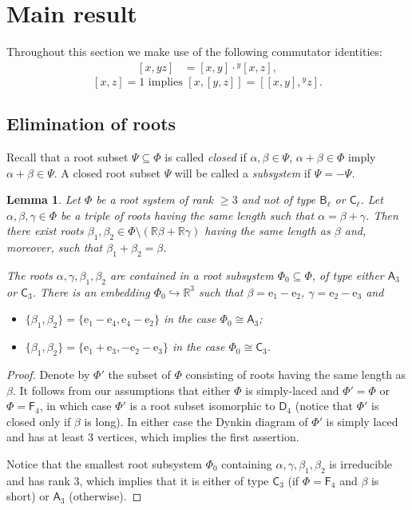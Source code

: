 \documentclass{article}
\numberwithin{equation}{section}
\newtheorem{lemma}{Lemma} \numberwithin{lemma}{section}
\theoremstyle{definition}
\theoremstyle{remark}
\newcommand{\rA}{\mathsf{A}}
\newcommand{\rB}{\mathsf{B}}
\newcommand{\rC}{\mathsf{C}}
\newcommand{\rD}{\mathsf{D}}
\newcommand{\rF}{\mathsf{F}}
\begin{document}
\section{Main result}
Throughout this section we make use of the following commutator identities:
\begin{align}
\label{eq:comm-mult-rhs}[x, yz]& =   [x, y] \cdot {}^{y}\![x, z],
\end{align}
\begin{equation} \label{eq:HW-corr} [x,z] = 1 \text{ implies } [x, [y,z]] = [[x,y],{}^yz]. \end{equation} 
\subsection{Elimination of roots}
Recall that a root subset $\Psi \subseteq \Phi$ is called {\it closed} if $\alpha, \beta \in \Psi$, $\alpha+\beta\in\Phi$ imply $\alpha+\beta\in \Psi$. A closed root subset $\Psi$ will be called a {\it subsystem} if $\Psi = -\Psi$.

\begin{lemma}\label{ThreeRoots}
Let \(\Phi\) be a root system of rank \(\geq 3\) and not of type \(\rB_\ell\) or \(\rC_\ell\). Let \(\alpha, \beta, \gamma \in \Phi\) be a triple of roots having the same length such that $\alpha = \beta + \gamma$.  
Then there exist roots \(\beta_1, \beta_2 \in \Phi \setminus (\mathbb R\beta + \mathbb R\gamma)\) having the same length as $\beta$ and, moreover, such that \(\beta_1 + \beta_2 = \beta\).

The roots $\alpha, \gamma, \beta_1, \beta_2$ are contained in a root subsystem $\Phi_0 \subseteq \Phi$, of type either \(\rA_3\) or \(\rC_3\). There is an embedding \(\Phi_0 \hookrightarrow  \mathbb R^3\) such that \(\beta = \mathrm e_1 - \mathrm e_2\), \(\gamma = \mathrm e_2 - \mathrm e_3\) and 
\begin{itemize}
 \item \(\{\beta_1, \beta_2\} = \{\mathrm e_1 - \mathrm e_4, \mathrm e_4 - \mathrm e_2\}\) in the case \(\Phi_0\cong\rA_3\);
 \item \(\{\beta_1, \beta_2\} = \{\mathrm e_1 + \mathrm e_3, -\mathrm e_2 - \mathrm e_3\}\) in the case \(\Phi_0\cong\rC_3\).
\end{itemize}
\end{lemma}
\begin{proof}
Denote by $\Phi'$ the subset of $\Phi$ consisting of roots having the same length as $\beta$.
It follows from our assumptions that either $\Phi$ is simply-laced and $\Phi' = \Phi$ or $\Phi = \rF_4$, in which case $\Phi'$ is a root subset isomorphic to $\rD_4$ (notice that $\Phi'$ is closed only if $\beta$ is long). In either case the Dynkin diagram of $\Phi'$ is simply laced and has at least $3$ vertices, which implies the first assertion.

Notice that the smallest root subsystem $\Phi_0$ containing $\alpha, \gamma, \beta_1, \beta_2$ is irreducible and has rank $3$, which implies that it is either of type  $\rC_3$ (if $\Phi = \rF_4$ and $\beta$ is short) or $\rA_3$ (otherwise). \end{proof}
\end{document}
